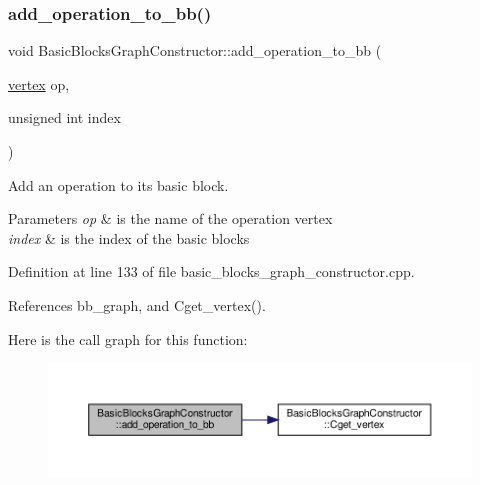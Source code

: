 \mbox{\label{classBasicBlocksGraphConstructor_a51ceaaa63ee039bd69ddeb6d2822db19}} 
\subsubsection{\texorpdfstring{add\+\_\+operation\+\_\+to\+\_\+bb()}{add\_operation\_to\_bb()}}
{\footnotesize\ttfamily void Basic\+Blocks\+Graph\+Constructor\+::add\+\_\+operation\+\_\+to\+\_\+bb (\begin{DoxyParamCaption}\item[{\hyperlink{graph_8hpp_abefdcf0544e601805af44eca032cca14}{vertex}}]{op,  }\item[{unsigned int}]{index }\end{DoxyParamCaption})}



Add an operation to its basic block. 


\begin{DoxyParams}{Parameters}
{\em op} & is the name of the operation vertex \\
\hline
{\em index} & is the index of the basic blocks \\
\hline
\end{DoxyParams}


Definition at line 133 of file basic\+\_\+blocks\+\_\+graph\+\_\+constructor.\+cpp.



References bb\+\_\+graph, and Cget\+\_\+vertex().

Here is the call graph for this function\+:
\nopagebreak
\begin{figure}[H]
\begin{center}
\leavevmode
\includegraphics[width=350pt]{d6/d91/classBasicBlocksGraphConstructor_a51ceaaa63ee039bd69ddeb6d2822db19_cgraph}
\end{center}
\end{figure}
\mbox{\label{classBasicBlocksGraphConstructor_a41ed65b4ee48cb0d825f89abcf7de575}} 
